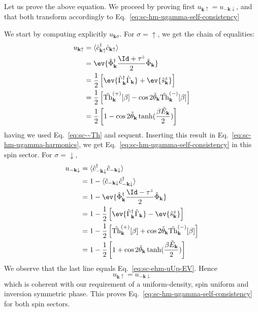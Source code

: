 Let us prove the above equation. We proceed by proving first $u_{\mathbf{k}\uparrow} = 	u_{-\mathbf{k}\downarrow}$, and that both transform accordingly to Eq.~\eqref{eq:sc-hm-ugamma-self-consistency}

\begin{tabproof}
	
	We start by computing explicitly $u_{\mathbf{k}\sigma}$. For $\sigma=\uparrow$, we get the chain of equalities:
	\begin{align}
		u_{\mathbf{k}\uparrow} &= \langle \hat c_{\mathbf{k}\uparrow}^\dagger \hat c_{\mathbf{k}\uparrow} \rangle \nonumber \\	
		&= \ev{
			\hat \Phi_\mathbf{k}^\dagger \frac{\Id + \tau^z}{2} \hat \Phi_\mathbf{k}
		} \nonumber \\
		&= \frac{1}{2} \left[
			\ev{
				\hat \Gamma_\mathbf{k}^\dagger \hat \Gamma_\mathbf{k}
			} + \ev{\hat s_\mathbf{k}^z}
		\right] \nonumber \\
		&= \frac{1}{2} \left[
			\tilde{\mathrm{Th}}_\mathbf{k}^{(+)} [\beta] - 
			\cos 2 \tilde{\theta}_\mathbf{k} \tilde{\mathrm{Th}}_\mathbf{k}^{(-)} [\beta]
		\right] \nonumber \\
		&= \frac{1}{2} \left[
			1 - \cos 2 \tilde{\theta}_\mathbf{k} \tanh(\frac{\beta \tilde{E}_\mathbf{k}}{2})
		\right] \label{eq:sc-ehm-uUp-EV}
	\end{align}
	having we used Eq.~\eqref{eq:sc-~Th} and sequent. Inserting this result in Eq.~\eqref{eq:sc-hm-ugamma-harmonics}, we get Eq.~\eqref{eq:sc-hm-ugamma-self-consistency} in this spin sector. For $\sigma=\downarrow$,
	\begin{align}
		u_{-\mathbf{k}\downarrow} &= \langle \hat c_{-\mathbf{k}\downarrow}^\dagger \hat c_{-\mathbf{k}\downarrow} \rangle \nonumber \\	
		&= 1 - \langle \hat c_{-\mathbf{k}\downarrow} \hat c_{-\mathbf{k}\downarrow}^\dagger \rangle \nonumber \\
		&= 1 - \ev{
			\hat \Phi_\mathbf{k}^\dagger \frac{\Id - \tau^z}{2} \hat \Phi_\mathbf{k}
		} \nonumber \\
		&= 1 - \frac{1}{2} \left[
		\ev{
			\hat \Gamma_\mathbf{k}^\dagger \hat \Gamma_\mathbf{k}
		} - \ev{\hat s_\mathbf{k}^z}
		\right] \nonumber \\
		&= 1 - \frac{1}{2} \left[
			\tilde{\mathrm{Th}}_\mathbf{k}^{(+)} [\beta] + 
			\cos 2 \tilde{\theta}_\mathbf{k} \tilde{\mathrm{Th}}_\mathbf{k}^{(-)} [\beta]
		\right] \nonumber \\
		&= 1 - \frac{1}{2} \left[
		1 + \cos 2 \tilde{\theta}_\mathbf{k} \tanh(\frac{\beta \tilde{E}_\mathbf{k}}{2})
		\right] \label{eq:sc-ehm-uDown-EV}
	\end{align}
	We observe that the last line equals Eq.~\eqref{eq:sc-ehm-uUp-EV}. Hence
	\[
		u_{\mathbf{k}\uparrow} = 	u_{-\mathbf{k}\downarrow}
	\]
	which is coherent with our requirement of a uniform-density, spin uniform and inversion symmetric phase. This proves Eq.~\eqref{eq:sc-hm-ugamma-self-consistency} for both spin sectors.
\end{tabproof}
